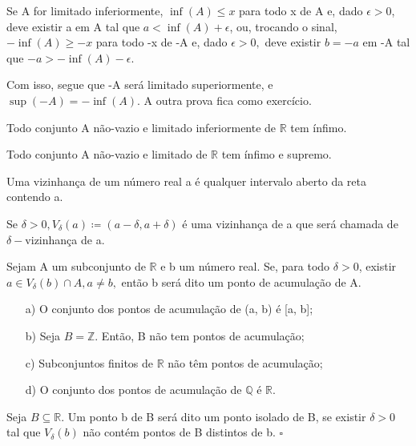 \documentclass[Analysis/analysis_notes.tex]{subfiles}
\begin{document}
\begin{proof*}
	Se A for limitado inferiormente, $\inf{(A)} \leq{x}$ para todo x de A e, dado $\epsilon > 0$, deve existir a em A tal que
	$a < \inf{(A)} + \epsilon$, ou, trocando o sinal, $-\inf{(A)} \geq{-x}$ para todo -x de -A e, dado $\epsilon > 0,$ deve existir
	$b = -a$ em -A tal que $-a > -\inf{(A)} - \epsilon.$

	Com isso, segue que -A ser\'a limitado superiormente, e $\sup{(-A)} = -\inf{(A)}.$ A outra prova fica como exerc\'icio. \qedsymbol
\end{proof*}
\begin{crl*}
	Todo conjunto A n\~ao-vazio e limitado inferiormente de $\mathbb{R}$ tem \'infimo.
\end{crl*}
\begin{crl*}
	Todo conjunto A n\~ao-vazio e limitado de $\mathbb{R}$ tem \'infimo e supremo.
\end{crl*}
\begin{def*}
	Uma vizinhan\c ca de um n\'umero real a \'e qualquer intervalo aberto da reta contendo a.
\end{def*}
\begin{example}
	Se $\delta > 0, V_{\delta}(a)\coloneqq(a - \delta, a + \delta)$ \'e uma vizinhan\c ca de a que ser\'a chamada de $\delta-$vizinhan\c ca de a.
\end{example}
\begin{def*}
	Sejam A um subconjunto de $\mathbb{R}$ e b um n\'umero real. Se, para todo $\delta > 0$, existir $a\in V_{\delta}(b)\cap{A}, a\neq b,$
	ent\~ao b ser\'a dito um ponto de acumula\c c\~ao de A.
\end{def*}
\begin{example}
	\begin{itemize}
		\item[a)]O conjunto dos pontos de acumula\c c\~ao de (a, b) \'e [a, b];
		\item[b)]Seja $B = \mathbb{Z}.$ Ent\~ao, B n\~ao tem pontos de acumula\c c\~ao;
		\item[c)] Subconjuntos finitos de $\mathbb{R}$ n\~ao t\^em pontos de acumula\c c\~ao;
		\item[d)] O conjunto dos pontos de acumula\c c\~ao de $\mathbb{Q}$ \'e $\mathbb{R}$.
	\end{itemize}
\end{example}
\begin{def*}
	Seja $B\subseteq{\mathbb{R}}$. Um ponto b de B ser\'a dito um ponto isolado de B, se existir $\delta > 0$ tal que $V_{\delta}(b)$
	n\~ao cont\'em pontos de B distintos de b. $\square$
\end{def*}
\end{document}
